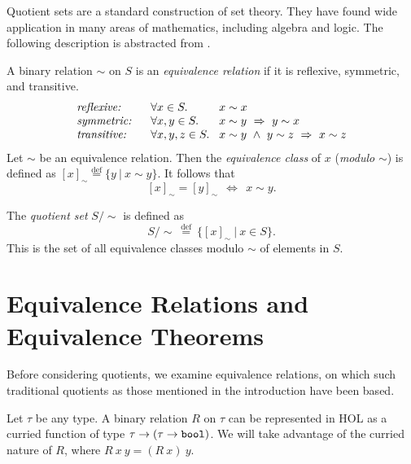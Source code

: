 \documentclass[envcountsame,runningheads]{llncs}
\def\defeq{\stackrel{\mathrm{def}}{=}}
\begin{document}
Quotient sets are a standard construction of set theory.
They have found wide application in many areas of mathematics,
including algebra and logic.
The following description is abstracted from \cite{End77}.

A binary relation
$\sim$
on $S$ is
an {\it equivalence relation\/}
if it is reflexive, symmetric,  and transitive.
$$
\begin{array}{l@{\hspace{0.6cm}}l@{\hspace{0.3cm}}l}
\mbox{\it reflexive:} &
\forall x \in S. & x \sim x \\
\mbox{\it symmetric:} &
\forall x,y \in S. & x \sim y \ \Rightarrow \ y \sim x \\
\mbox{\it transitive:} &
\forall x,y,z \in S. & x \sim y \ \wedge \ y \sim z \ \Rightarrow \ x \sim z
\end{array}
$$
Let $\sim$ be an equivalence relation.
Then the {\it equivalence class\/} of $x$ ({\it modulo\/} $\sim$)
is defined as $[ x ]_{\sim} \defeq \{ y \ | \ x \sim y \}$.
It follows \cite{End77} that
$$
[ x ]_{\sim} = [ y ]_{\sim} \ \ \Leftrightarrow \ \ x \sim y .
$$

\noindent
The {\it quotient set\/} $S / \mathbin{\sim}$ is defined as
$$
S / \mathbin{\sim} \ \defeq \ \{ [ x ]_{\sim} \ | \ x \in S \}.
$$
\noindent
This is the set of all equivalence classes modulo $\sim$ of elements in $S$.



%
\section{Equivalence Relations and Equivalence Theorems}
%
\label{equivalence}

%
%
Before considering quotients, we examine equivalence relations,
on which such traditional quotients as those mentioned in the introduction
have been based.

Let $\tau$ be any type.  A binary relation $R$ on $\tau$ can be
represented in HOL as a curried function
of type $\tau \rightarrow (\tau \rightarrow \mbox{\tt bool})$.
We will take advantage of the curried nature of $R$, where
$R\ x\ y = (R\ x)\ y$.
\end{document}
